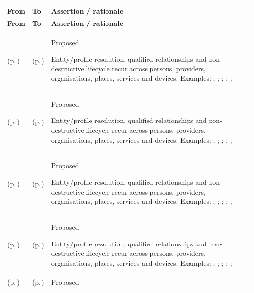 \begin{longtable}{|>{\raggedright\arraybackslash}p{0.27\TableWidth}|>{\raggedright\arraybackslash}p{0.27\TableWidth}|>{\raggedright\arraybackslash}p{0.46\TableWidth}|}
\hline\rowcolor{TableHead}\textbf{From} & \textbf{To} & \textbf{Assertion / rationale}\\\hline\endfirsthead
\hline\rowcolor{TableHead}\textbf{From} & \textbf{To} & \textbf{Assertion / rationale}\\\hline\endhead
\hline\endfoot
\nameref{cap:bec-person-identity} (p.\,\pageref{cap:bec-person-identity}) & \nameref{cap:ec-01} (p.\,\pageref{cap:ec-01}) & Proposed

Entity/profile resolution, qualified relationships and non-destructive lifecycle recur across persons, providers, organisations, places, services and devices. Examples: \nameref{feature:feat-em-01}; \nameref{feature:feat-em-02}; \nameref{feature:feat-em-03}; \nameref{feature:feat-em-04}; \nameref{function:resolve-person-identifier}; \nameref{service:person-identifier-resolution}\\\hline
\nameref{cap:bec-person-identity} (p.\,\pageref{cap:bec-person-identity}) & \nameref{cap:ec-03} (p.\,\pageref{cap:ec-03}) & Proposed

Entity/profile resolution, qualified relationships and non-destructive lifecycle recur across persons, providers, organisations, places, services and devices. Examples: \nameref{feature:feat-em-01}; \nameref{feature:feat-em-02}; \nameref{feature:feat-em-03}; \nameref{feature:feat-em-04}; \nameref{function:resolve-person-identifier}; \nameref{service:person-identifier-resolution}\\\hline
\nameref{cap:bec-person-identity} (p.\,\pageref{cap:bec-person-identity}) & \nameref{cap:ec-05} (p.\,\pageref{cap:ec-05}) & Proposed

Entity/profile resolution, qualified relationships and non-destructive lifecycle recur across persons, providers, organisations, places, services and devices. Examples: \nameref{feature:feat-em-01}; \nameref{feature:feat-em-02}; \nameref{feature:feat-em-03}; \nameref{feature:feat-em-04}; \nameref{function:resolve-person-identifier}; \nameref{service:person-identifier-resolution}\\\hline
\nameref{cap:bec-person-identity} (p.\,\pageref{cap:bec-person-identity}) & \nameref{cap:ec-07} (p.\,\pageref{cap:ec-07}) & Proposed

Entity/profile resolution, qualified relationships and non-destructive lifecycle recur across persons, providers, organisations, places, services and devices. Examples: \nameref{feature:feat-em-01}; \nameref{feature:feat-em-02}; \nameref{feature:feat-em-03}; \nameref{feature:feat-em-04}; \nameref{function:resolve-person-identifier}; \nameref{service:person-identifier-resolution}\\\hline
\nameref{cap:bec-healthcare-subject} (p.\,\pageref{cap:bec-healthcare-subject}) & \nameref{cap:ec-01} (p.\,\pageref{cap:ec-01}) & Proposed


\end{longtable}
